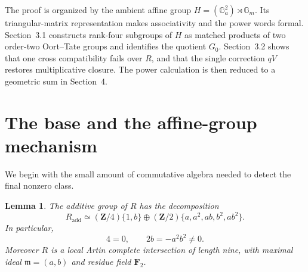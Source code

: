\documentclass[11pt]{amsart}
\newtheorem{lemma}[theorem]{Lemma}
\theoremstyle{remark}
\newcommand{\Z}{\mathbf Z}
\newcommand{\F}{\mathbf F}
\newcommand{\Ga}{\mathbb G_a}
\newcommand{\Gm}{\mathbb G_m}
\newcommand{\m}{\mathfrak m}
\begin{document}
The proof is organized by the ambient affine group
\(H=(\Ga^2)\rtimes\Gm\).  Its triangular-matrix representation
makes associativity and the power words formal.  Section~3.1 constructs
rank-four subgroups of \(H\) as matched products of two order-two
Oort--Tate groups and identifies the quotient \(G_0\).  Section~3.2
shows that one cross compatibility fails over \(R\), and that the
single correction \(qV\) restores multiplicative closure.  The power
calculation is then reduced to a geometric sum in Section~4.
\section{The base and the affine-group mechanism}

We begin with the small amount of commutative algebra needed to detect
the final nonzero class.

\begin{lemma}\label{lem:base}
The additive group of \(R\) has the decomposition
\begin{equation}\label{eq:additive-R}
 R_{\mathrm{add}}\simeq
 (\Z/4)\{1,b\}\oplus
 (\Z/2)\{a,a^2,ab,b^2,ab^2\}.
\end{equation}
In particular,
\[
 4=0,\qquad 2b=-a^2b^2\ne0.
\]
Moreover \(R\) is a local Artin complete intersection of length nine,
with maximal ideal \(\m=(a,b)\) and residue field \(\F_2\).
\end{lemma}
\end{document}
